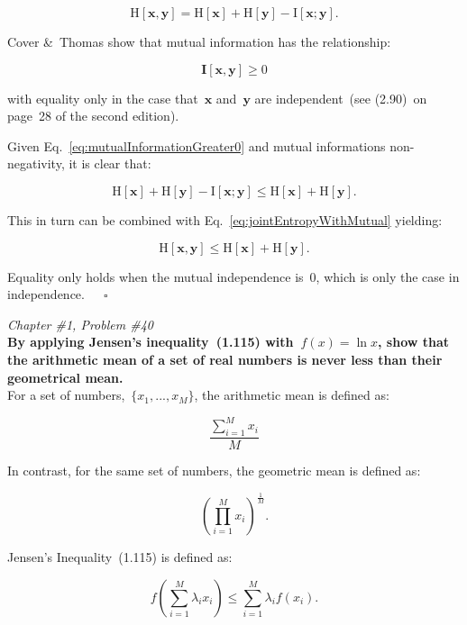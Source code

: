 \documentclass{report}
\newcommand{\problem}[3]{\noindent \textit{Chapter \##1, Problem \##2}
  \\
  \textbf{#3}  \\}
\begin{document}
  \begin{equation}
    \textrm{H}[\mathbf{x},\mathbf{y}] = \textrm{H}[\mathbf{x}] + \textrm{H}[\mathbf{y}] - \textrm{I}[\mathbf{x};\mathbf{y}] \textrm{.}
    \label{eq:jointEntropyWithMutual}
  \end{equation}
  
  Cover \&~Thomas show that mutual information has the relationship:
  
  \begin{equation}
    \mathbf{I}[\mathbf{x},\mathbf{y}] \geq 0
    \label{eq:mutualInformationGreater0}
  \end{equation}
  
  with equality only in the case that~$\mathbf{x}$ and~$\mathbf{y}$ are independent~(see (2.90)~on page~28 of the second edition).  
  
  Given Eq.~\eqref{eq:mutualInformationGreater0} and mutual informations non-negativity, it is clear that:
  
  \[ \textrm{H}[\mathbf{x}] + \textrm{H}[\mathbf{y}] - \textrm{I}[\mathbf{x};\mathbf{y}] \leq \textrm{H}[\mathbf{x}] + \textrm{H}[\mathbf{y}] \textrm{.} \]
  
  This in turn can be combined with Eq.~\eqref{eq:jointEntropyWithMutual} yielding:
  
  \begin{equation}
    \textrm{H}[\mathbf{x},\mathbf{y}] \leq \textrm{H}[\mathbf{x}] + \textrm{H}[\mathbf{y}] \textrm{.}
  \end{equation}
  
  Equality only holds when the mutual independence is~$0$, which is only the case in independence.~~~$\square$
  
  \newpage
  \problem{1}{40}{By applying Jensen's inequality~(1.115) with~$f(x)=\ln x$, show that the arithmetic mean of a set of real numbers is never less than their geometrical mean.}
  
  For a set of numbers,~$\{x_1,...,x_M\}$, the arithmetic mean is defined as:
  
  \[ \frac{\sum_{i=1}^{M}x_i}{M} \]
  
  In contrast, for the same set of numbers, the geometric mean is defined as:
  
  \[ \left( \prod_{i=1}^{M}x_i \right)^\frac{1}{M}\textrm{.} \]
  
  Jensen's Inequality~(1.115) is defined as:
  
  \[ f \left( \sum_{i=1}^M{\lambda_{i} x_i} \right) \leq \sum_{i=1}^M{\lambda_{i} f(x_i)}\textrm{.}\]
  
\end{document}
